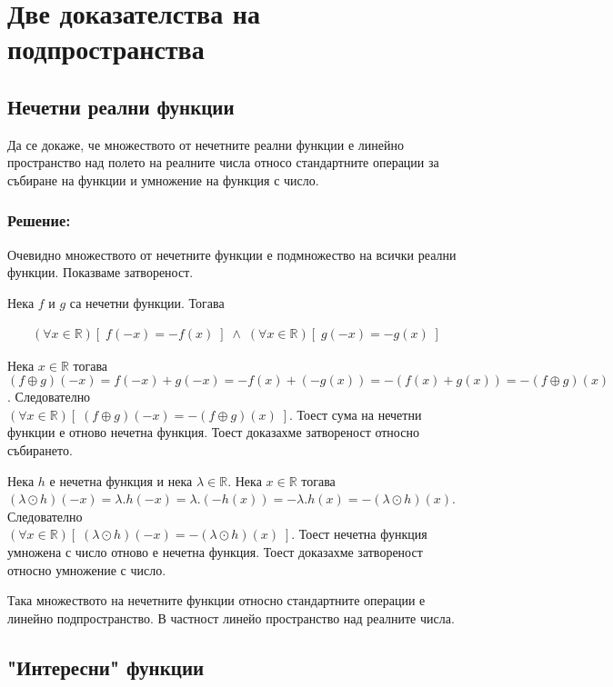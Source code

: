 \documentclass{article}[12pt]
\begin{document}
\section{Две доказателства на подпространства}

\subsection{Нечетни реални функции}

Да се докаже, че множеството от нечетните реални функции е линейно пространство
над полето на реалните числа относо стандартните операции за събиране на функции
и умножение на функция с число.

\subsubsection{Решение:}

Очевидно множеството от нечетните функции е подмножество на всички реални функции.
Показваме затвореност.

Нека \(f\) и \(g\) са нечетни функции. Тогава

\begin{align*}
(\forall x \in \mathbb{R})[\; f(-x) = -f(x) \;] \; \land \;
(\forall x \in \mathbb{R})[\; g(-x) = -g(x) \;]
\end{align*}

Нека \(x \in \mathbb{R}\) тогава \((f \oplus g)(-x) = f(-x) + g(-x) = -f(x) + (-g(x)) = -(f(x) + g(x)) = -(f \oplus g)(x)\).
Следователно \\ \((\forall x \in \mathbb{R})[\; (f \oplus g)(-x) = -(f \oplus g)(x) \;]\).
Тоест сума на нечетни функции е отново нечетна функция.
Тоест доказахме затвореност относно събирането.


Нека \(h\) е нечетна функция и нека \(\lambda \in \mathbb{R}\).
Нека \(x \in \mathbb{R}\) тогава \((\lambda \odot h)(-x) = \lambda.h(-x) = \lambda.(-h(x)) = -\lambda.h(x) = -(\lambda \odot h)(x)\).
Следователно \\ \((\forall x \in \mathbb{R})[\; (\lambda \odot h)(-x) = -(\lambda \odot h)(x) \;]\).
Тоест нечетна функция умножена с число отново е нечетна функция.
Тоест доказахме затвореност относно умножение с число.


Така множеството на нечетните функции относно стандартните операции е линейно подпространство.
В частност линейо пространство над реалните числа.

\subsection{"Интересни" \; функции}
\end{document}
